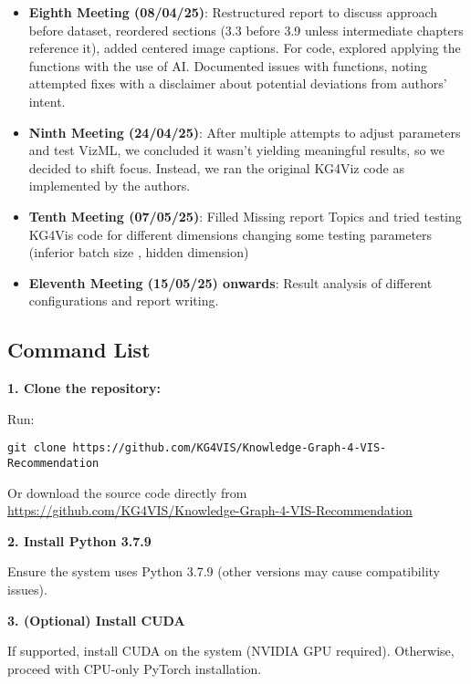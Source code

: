 \begin{itemize}
\item \textbf{Eighth Meeting (08/04/25)}: Restructured report to discuss approach before dataset, reordered sections (3.3 before 3.9 unless intermediate chapters reference it), added centered image captions. For code, explored applying the functions with the use of AI. Documented issues with functions, noting attempted fixes with a disclaimer about potential deviations from authors' intent.

\item \textbf{Ninth Meeting (24/04/25)}: After multiple attempts to adjust parameters and test VizML, we concluded it wasn't yielding meaningful results, so we decided to shift focus. Instead, we ran the original KG4Viz code as implemented by the authors.

\item \textbf{Tenth Meeting (07/05/25)}: Filled Missing report Topics and tried testing KG4Vis code for different dimensions changing some testing parameters (inferior batch size , hidden dimension)

\item \textbf{Eleventh Meeting (15/05/25) onwards}: Result analysis of different configurations and report writing.



\end{itemize}

\subsection{Command List}

\textbf{1. Clone the repository:}

Run:
\begin{lstlisting}
git clone https://github.com/KG4VIS/Knowledge-Graph-4-VIS-Recommendation
\end{lstlisting}

Or download the source code directly from \url{https://github.com/KG4VIS/Knowledge-Graph-4-VIS-Recommendation}

\vspace{1em}
\textbf{2. Install Python 3.7.9}

Ensure the system uses Python 3.7.9 (other versions may cause compatibility issues).

\vspace{1em}
\textbf{3. (Optional) Install CUDA}

If supported, install CUDA on the system (NVIDIA GPU required). Otherwise, proceed with CPU-only PyTorch installation.

